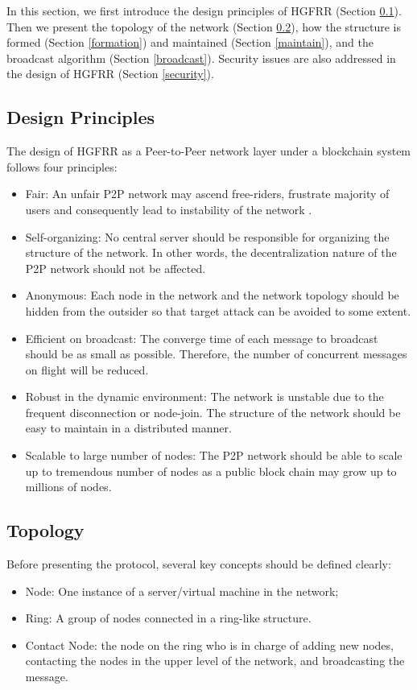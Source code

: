 In this section, we first introduce the design principles of HGFRR (Section \cref{principles}). Then we present the topology of the network (Section \cref{topo}), how the structure is formed (Section \cref{formation}) and maintained (Section \cref{maintain}), and the broadcast algorithm (Section \cref{broadcast}). Security issues are also addressed in the design of HGFRR (Section \cref{security}).

\subsection{Design Principles} \label{principles}

The design of HGFRR as a Peer-to-Peer network layer under a blockchain system follows four principles:
\noindent
\begin{itemize}[noitemsep, topsep=0pt]
	\item Fair: An unfair P2P network may ascend free-riders, frustrate majority of users and consequently lead to instability of the network \cite{naghizadeh2016improving}.
	\item Self-organizing: No central server should be responsible for organizing the structure of the network. In other words, the decentralization nature of the P2P network should not be affected.
	\item Anonymous: Each node in the network and the network topology should be hidden from the outsider so that target attack can be avoided to some extent.
	\item Efficient on broadcast: The converge time of each message to broadcast should be as small as possible. Therefore, the number of concurrent messages on flight will be reduced.
	\item Robust in the dynamic environment: The network is unstable due to the frequent disconnection or node-join. The structure of the network should be easy to maintain in a distributed manner.
	\item Scalable to large number of nodes: The P2P network should be able to scale up to tremendous number of nodes as a public block chain may grow up to millions of nodes.
\end{itemize}

\subsection{Topology} \label{topo}

Before presenting the protocol, several key concepts should be defined clearly:
\begin{itemize}[noitemsep, topsep=0pt]
	\item Node: One instance of a server/virtual machine in the network;
	\item Ring: A group of nodes connected in a ring-like structure.
	\item Contact Node: the node on the ring who is in charge of adding new nodes, contacting the nodes in the upper level of the network, and broadcasting the message.\\
\end{itemize}


